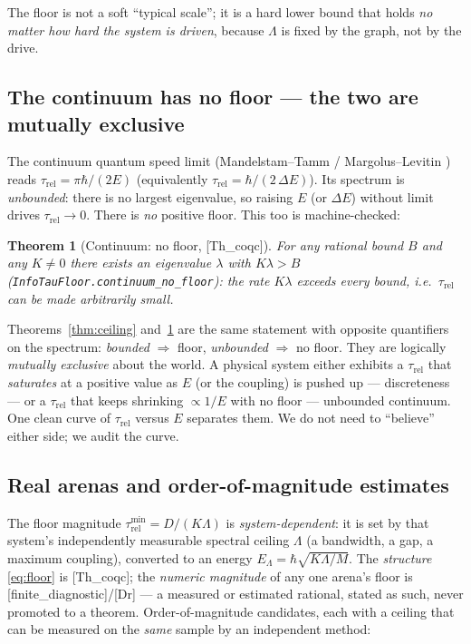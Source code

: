 \documentclass[10pt,twocolumn]{article}
\newtheorem{theorem}{Theorem}
\theoremstyle{definition}
\newcommand{\Thq}{\textsf{[Th\_coqc]}}
\newcommand{\Fin}{\textsf{[finite\_diagnostic]}}
\newcommand{\Dr}{\textsf{[Dr]}}
\newcommand{\code}[1]{\texttt{#1}}
\begin{document}
The floor is not a soft ``typical scale''; it is a hard lower bound that holds
\emph{no matter how hard the system is driven}, because $\Lambda$ is fixed by the graph,
not by the drive.

\subsection{The continuum has no floor --- the two are mutually exclusive}
\label{sec:pred-continuum}

The continuum quantum speed limit (Mandelstam--Tamm \cite{mandelstamtamm1945} /
Margolus--Levitin \cite{margolus1998}) reads
$\tau_{\mathrm{rel}} = \pi\hbar/(2E)$ (equivalently $\tau_{\mathrm{rel}}=\hbar/(2\,\Delta E)$). Its spectrum is
\emph{unbounded}: there is no largest eigenvalue, so raising $E$ (or $\Delta E$) without
limit drives $\tau_{\mathrm{rel}} \to 0$. There is \emph{no} positive floor. This too is machine-checked:

\begin{theorem}[Continuum: no floor, \Thq{}]\label{thm:nofloor}
For any rational bound $B$ and any $K\ne 0$ there exists an eigenvalue $\lambda$ with
$K\lambda > B$ \emph{(\code{InfoTauFloor.continuum\_no\_floor})}: the rate $K\lambda$
exceeds \emph{every} bound, i.e.\ $\tau_{\mathrm{rel}}$ can be made arbitrarily small.
\end{theorem}

Theorems~\ref{thm:ceiling} and~\ref{thm:nofloor} are the same statement with opposite
quantifiers on the spectrum: \emph{bounded} $\Rightarrow$ floor, \emph{unbounded}
$\Rightarrow$ no floor. They are logically \emph{mutually exclusive} about the world. A
physical system either exhibits a $\tau_{\mathrm{rel}}$ that \emph{saturates} at a positive value as
$E$ (or the coupling) is pushed up --- discreteness --- or a $\tau_{\mathrm{rel}}$ that keeps shrinking
$\propto 1/E$ with no floor --- unbounded continuum. One clean curve of $\tau_{\mathrm{rel}}$ versus
$E$ separates them. We do not need to ``believe'' either side; we audit the curve.

\subsection{Real arenas and order-of-magnitude estimates}\label{sec:pred-arenas}

The floor magnitude $\tau_{\mathrm{rel}}^{\min}=D/(K\Lambda)$ is \emph{system-dependent}: it is set by
that system's independently measurable spectral ceiling $\Lambda$ (a bandwidth, a gap, a
maximum coupling), converted to an energy $E_\Lambda=\hbar\sqrt{K\Lambda/M}$. The
\emph{structure} \eqref{eq:floor} is \Thq{}; the \emph{numeric magnitude} of any one
arena's floor is \Fin{}/\Dr{} --- a measured or estimated rational, stated as such, never
promoted to a theorem. Order-of-magnitude candidates, each with a ceiling that can be
measured on the \emph{same} sample by an independent method:
\end{document}

